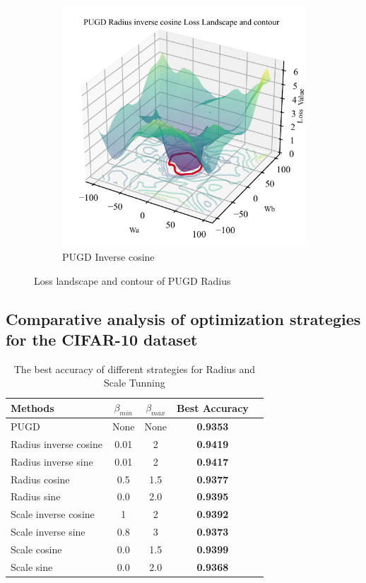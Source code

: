 \documentclass[10pt,twocolumn,letterpaper]{article}
\begin{document}
\begin{figure}[htbp]
  \begin{subfigure}[t]{\columnwidth}
    \includegraphics[width=\linewidth, height=0.7\linewidth]{images/PUGDRICOS_LLC10.pdf} 
    \caption{PUGD Inverse cosine}
    \label{fig:pcos}
  \end{subfigure}
  \caption{Loss landscape and contour of PUGD Radius}
  \label{fig:llc_compare}
\end{figure}

\subsection{Comparative analysis of optimization strategies for the CIFAR-10 dataset}
\label{appendix:cifar10}
\begin{table}[H]
	\begin{center}
		\begin{tabular}{|l|c|c|c|c|}
			\hline
			Methods & $\beta_{min}$ & $\beta_{max}$ & Best Accuracy \\
			\hline
			PUGD	& None & None & \bf{0.9353} \\
			\hline
			Radius inverse cosine &	0.01	&	2	& \bf{0.9419} \\
			Radius inverse sine 	&	0.01	&	2	& \bf{0.9417} \\
			Radius cosine &	0.5	&	1.5	& \bf{0.9377} \\
			Radius sine 	&	0.0	&	2.0	& \bf{0.9395} \\
			\hline
			Scale inverse cosine &	1	&	2	& \bf{0.9392} \\
			Scale inverse sine 	&	0.8	&	3	& \bf{0.9373} \\
			Scale cosine &	0.0	&	1.5	& \bf{0.9399} \\
			Scale sine 	&	0.0	&	2.0	& \bf{0.9368} \\
			\hline
		\end{tabular}
	\end{center}
	\caption{%
		The best accuracy of different strategies for Radius and Scale Tunning
	}
	\label{tab:cifar10}
\end{table}
\end{document}
